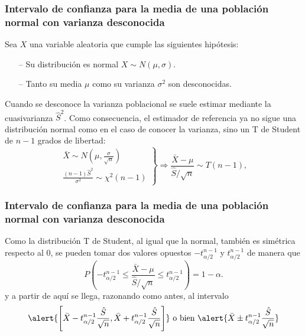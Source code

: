 \begin{frame}
\frametitle{Intervalo de confianza para la media de una población normal con varianza desconocida}
Sea $X$ una variable aleatoria que cumple las siguientes hipótesis:
\begin{itemize}
\item[--] Su distribución es normal $X\sim N(\mu,\sigma)$.
\item[--] Tanto su media $\mu$ como su varianza $\sigma^2$ son desconocidas.
\end{itemize}

Cuando se desconoce la varianza poblacional se suele estimar mediante la cuasivarianza $\hat{S}^2$.
Como consecuencia, el estimador de referencia ya no sigue una distribución normal como en el caso de conocer la varianza, sino un T de Student de $n-1$ grados de libertad:
\[
\left.
\begin{array}{l}
\bar X \sim N\left(\mu,\frac{\sigma}{\sqrt{n}}\right)\\
\displaystyle\frac{(n-1)\hat{S}^2}{\sigma^2}\sim \chi^2(n-1)
\end{array}
\right\}
\Rightarrow
\frac{\bar X -\mu}{\hat{S}/\sqrt{n}}\sim T(n-1),
\]
\end{frame}


\begin{frame}
\frametitle{Intervalo de confianza para la media de una población normal con varianza desconocida}
Como la distribución T de Student, al igual que la normal, también es simétrica respecto al 0, se pueden tomar dos valores opuestos $-t^{n-1}_{\alpha/2}$ y $t^{n-1}_{\alpha/2}$ de manera que
\[
P\left(-t^{n-1}_{\alpha/2}\leq \frac{\bar X -\mu}{\hat{S}/\sqrt{n}} \leq t^{n-1}_{\alpha/2}\right) = 1-\alpha.
\]
y a partir de aquí se llega, razonando como antes, al intervalo
\[
\alert{\left[\bar{X}-t^{n-1}_{\alpha/2}\frac{\hat{S}}{\sqrt{n}},\bar{X}+t^{n-1}_{\alpha/2}\frac{\hat{S}}{\sqrt{n}}\right]}
\mbox{ o bien }
\alert{\bar{X}\pm t^{n-1}_{\alpha/2}\frac{\hat{S}}{\sqrt{n}}}
\]
\end{frame}


